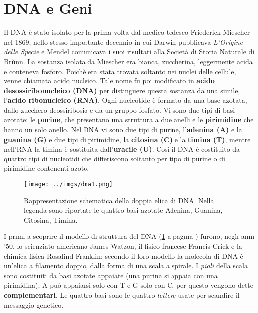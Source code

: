 \section{DNA e Geni}
\label{sec:dna}
Il DNA è stato isolato per la prima volta dal medico tedesco Friederick Miescher nel 1869, nello stesso importante decennio in cui Darwin pubblicava \textit{L'Origine delle Specie} e Mendel comunicava i suoi risultati alla Società di Storia Naturale di Brùnn. 
La sostanza isolata da Miescher era bianca, zuccherina, leggermente acida e conteneva fosforo.
Poichè era stata trovata soltanto nei nuclei delle cellule, venne chiamata acido nucleico. 
Tale nome fu poi modificato in \textbf{acido desossiribonucleico (DNA)} per distinguere questa sostanza da una simile, l'\textbf{acido ribonucleico (RNA)}. 
Ogni nucleotide è formato da una base azotata, dallo zucchero deossiribosio e da un gruppo fosfato.
Vi sono due tipi di basi azotate: le \textbf{purine}, che presentano una struttura a due anelli e le \textbf{pirimidine} che hanno un solo anello.
Nel DNA vi sono due tipi di purine, l'\textbf{adenina (A)} e la \textbf{guanina (G)} e due tipi di pirimidine, la \textbf{citosina (C)} e la \textbf{timina (T)}, mentre nell'RNA la timina è sostituita dall'\textbf{uracile (U)}.
Così il DNA è costituito da quattro tipi di nucleotidi che differiscono soltanto per tipo di purine o di pirimidine contenenti azoto.

\begin{figure}[h]
\begin{center}
\texttt{[image: ../imgs/dna1.png]}
\caption[Il DNA]{Rappresentazione schematica della doppia elica di DNA. Nella legenda sono riportate le quattro basi azotate Adenina, Guanina, Citosina, Timina.}
\label{Fig:dna}
\end{center}
\end{figure}

I primi a scoprire il modello di struttura del DNA (\ref{Fig:dna} a pagina \pageref{Fig:dna}) furono, negli anni '50, lo scienziato americano James Watzon, il fisico francese Francis Crick e la chimica-fisica Rosalind Franklin;  secondo il loro modello la molecola di DNA è un'elica a filamento doppio, dalla forma di una scala a spirale. 
I \textit{pioli} della scala sono costituiti da basi azotate appaiate (una purina si appaia con una pirimidina); A può appaiarsi solo con T e G solo con C, per questo vengono dette \textbf{complementari}. 
Le quattro basi  sono le quattro \textit{lettere} usate per scandire il messaggio genetico.


